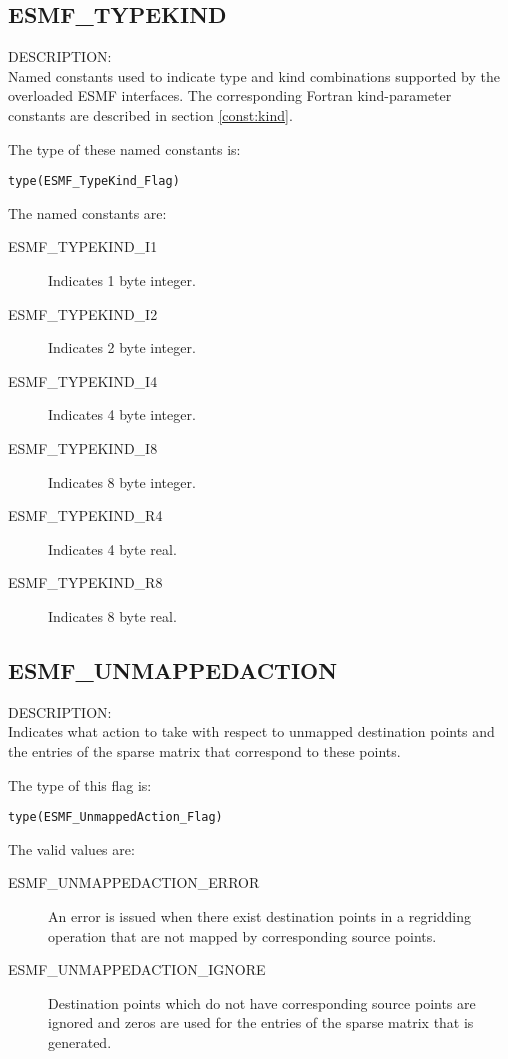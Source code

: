 \subsection{ESMF\_TYPEKIND}
\label{const:typekind}

{\sf DESCRIPTION:\\}
Named constants used to indicate type and kind combinations supported by the
overloaded ESMF interfaces. The corresponding Fortran kind-parameter constants
are described in section \ref{const:kind}.

The type of these named constants is:

{\tt type(ESMF\_TypeKind\_Flag)}

The named constants are:
\begin{description}
\item [ESMF\_TYPEKIND\_I1]
      Indicates 1 byte integer.
\item [ESMF\_TYPEKIND\_I2]
      Indicates 2 byte integer.
\item [ESMF\_TYPEKIND\_I4]
      Indicates 4 byte integer.
\item [ESMF\_TYPEKIND\_I8]
      Indicates 8 byte integer.
\item [ESMF\_TYPEKIND\_R4]
      Indicates 4 byte real.
\item [ESMF\_TYPEKIND\_R8]
      Indicates 8 byte real.
\end{description}

\subsection{ESMF\_UNMAPPEDACTION}
\label{const:unmappedaction}
{\sf DESCRIPTION:\\}
Indicates what action to take with respect to unmapped destination points
and the entries of the sparse matrix that correspond to these points.

The type of this flag is:

{\tt type(ESMF\_UnmappedAction\_Flag)}

The valid values are:
\begin{description}
	\item[ESMF\_UNMAPPEDACTION\_ERROR]
	An error is issued when there exist destination points in a regridding
	operation that are not mapped by corresponding source points.
	\item[ESMF\_UNMAPPEDACTION\_IGNORE]
	Destination points which do not have corresponding source points are 
	ignored and zeros are used for the entries of the sparse matrix
	that is generated.
\end{description}

